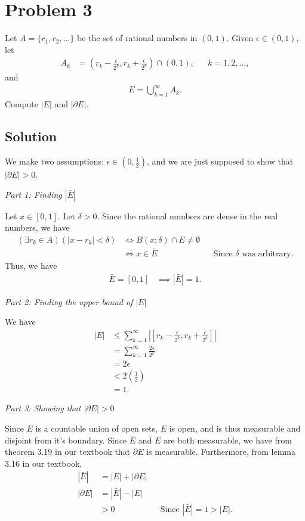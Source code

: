 \documentclass[10pt,a4paper]{article}
\makeatletter
\theoremstyle{theorem}
\newcommand{\proofpart}[2]{%
  \par
  \addvspace{\medskipamount}%
  \noindent\emph{Part #1: #2}\par\nobreak
  \addvspace{\smallskipamount}%
  \@afterheading
}
\theoremstyle{definition}
\makeatother
\begin{document}
\section*{Problem 3}
Let $A = \{r_1, r_2, ...\}$ be the set of rational numbers in $(0, 1)$. Given $\epsilon \in (0, 1)$, let 
\begin{align*}
A_k &= (r_k - \frac{\epsilon}{2^k}, r_k + \frac{\epsilon}{2^k}) \cap (0, 1), &&k=1,2,\ldots,
\end{align*} 
and 
\begin{align*}
E = \bigcup_{k=1}^\infty A_k.
\end{align*}
Compute $|E|$ and $|\partial E|$.

\subsection*{Solution}
We make two assumptions: $\epsilon \in (0, \frac{1}{2})$, and we are just supposed to show that $|\partial E| > 0$.
\proofpart{1}{Finding $|\bar{E}|$}
Let $x \in [0, 1]$. Let $\delta > 0$. Since the rational numbers are dense in the real numbers, we have 
\begin{align*}
(\exists r_k \in A)(|x - r_k| < \delta) &\iff B(x; \delta) \cap E \not= \emptyset\\
&\iff x \in \bar{E} && \text{Since }\delta \text{ was arbitrary}.
\end{align*}
Thus, we have
\begin{align*}
\bar{E} = [0, 1] &\implies |\bar{E}| = 1.
\end{align*} 

\proofpart{2}{Finding the upper bound of $|E|$}
We have
\begin{align*}
|E| &\leq \sum_{k=1}^\infty |[r_k - \frac{\epsilon}{2^k}, r_k + \frac{\epsilon}{2^k}]|\\
&= \sum_{k=1}^\infty \frac{2 \epsilon}{2^k}\\
&= 2 \epsilon\\
&< 2 \left(\frac{1}{2}\right)\\
&= 1.
\end{align*}

\proofpart{3}{Showing that $|\partial E| > 0$}
Since $E$ is a countable union of open sets, $E$ is open, and is thus measurable and disjoint from it's boundary. Since $\bar{E}$ and $E$ are both measurable, we have from theorem 3.19 in our textbook that $\partial E$ is measurable. Furthermore, from lemma 3.16 in our textbook,
\begin{align*}
|\bar{E}| &= |E| + |\partial E|\\
|\partial E| &= |\bar{E}| - |E|\\
&> 0 && \text{Since } |\bar{E}| = 1 > |E|.
\end{align*}
\end{document}
